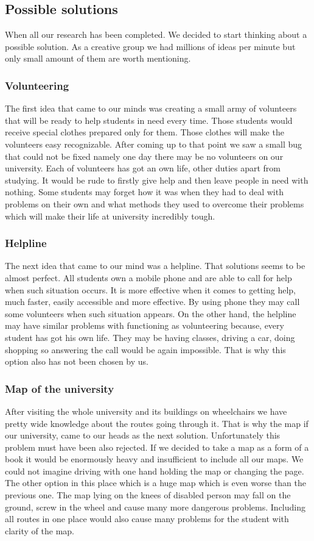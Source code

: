 \documentclass[12pt]{article}
\begin{document}
\subsection{Possible solutions}
When all our research has been completed. We decided to start thinking about a possible solution. As a creative group we had millions of ideas per minute but only small amount of them are worth mentioning. 

\subsubsection{Volunteering}
The first idea that came to our minds was creating a small army of volunteers that will be ready to help students in need every time. Those students would receive special clothes prepared only for them. Those clothes will make the volunteers easy recognizable. After coming up to that point we saw a small bug that could not be fixed namely one day there may be no volunteers on our university. Each of volunteers has got an own life, other duties apart from studying. It would be rude to firstly give help and then leave people in need with nothing. Some students may forget how it was when they had to deal with problems on their own and what methods they used to overcome their problems which will make their life at university incredibly tough.

\subsubsection{Helpline}
The next idea that came to our mind was a helpline. That solutions seems to be almost perfect. All students own a mobile phone and are able to call for help when such situation occurs. It is more effective when it comes to getting help, much faster, easily accessible and more effective. By using phone they may call some volunteers when such situation appears. On the other hand, the helpline may have similar problems with functioning as volunteering because, every student has got his own life. They may be having classes, driving a car, doing shopping so answering the call would be again impossible. That is why this option also has not been chosen by us. 

\subsubsection{Map of the university}
After visiting the whole university and its buildings on wheelchairs we have pretty wide knowledge about the routes going through it. That is why the map if our university, came to our heads as the next solution. Unfortunately this problem must have been also rejected. If we decided to take a map as a form of a book it would be enormously heavy and insufficient to include all our maps. We could not imagine driving with one hand holding the map or changing the page. The other option in this place which is a huge map which is even worse than the previous one. The map lying on the knees of disabled person may fall on the ground, screw in the wheel and cause many more dangerous problems. Including all routes in one place would also cause many problems for the student with clarity of the map. 
\end{document}
